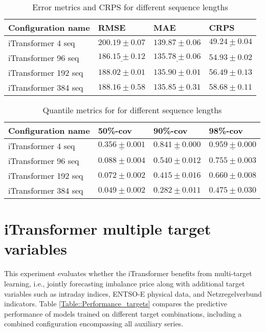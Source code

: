 \documentclass[class=scrbook, crop=false]{standalone}
\begin{document}
 \begin{table}[]
\centering
\begin{tabular}{l|l|l|l}
 Configuration name &  RMSE 		& MAE 			& CRPS \\\hline
iTransformer 4 seq    &$ 200.19 \pm 0.07	$&$ 139.87	\pm 0.06	$&$ \underline{49.24 \pm 0.04	}$ \\
 iTransformer 96 seq &$  \underline{186.15 \pm  0.12} $&$ \underline{135.78 \pm 0.06} $ &$  54.93\pm 0.02$\\
 iTransformer 192 seq &$ 188.02 \pm 0.01$ &$ 135.90 \pm 0.01$&$ 56.49 \pm0.13 $ \\
 iTransformer 384 seq &$ 188.16 \pm 0.58 $&$ 135.85 \pm 0.31 $&$ 58.68 \pm 0.11 $ \\
\end{tabular}
\caption{Error metrics and CRPS for different sequence lengths}
\label{Table::Performance_sequence_length}

\end{table}
\begin{table}
\centering
\begin{tabular}{l|l|l|l}
 Configuration name 	& 50\%-cov 		& 90\%-cov 		& 98\%-cov \\\hline
iTransformer  4 seq   	&$ \underline{0.356	\pm 0.001}$&$ \underline{0.841	\pm 0.000}	$&$\underline{0.959 \pm 0.000}	$ \\
 iTransformer 96 seq 	&$ 0.088 \pm 0.004$&$ 0.540 \pm 0.012$ 	&$ 0.755 \pm 0.003$ \\
 iTransformer 192 seq 	&$ 0.072 \pm 0.002$&$ 0.415\pm 0.016$ 	&$ 0.660 \pm 0.008$ \\
 iTransformer 384 seq 	&$ 0.049 \pm 0.002 $&$ 0.282 \pm 0.011$	&$ 0.475 \pm 0.030$\\
\end{tabular}
\caption{Quantile metrics for for different sequence lengths}
\label{Table::Performance_sequence_length2}
\end{table}



\section{iTransformer multiple target variables}

This experiment evaluates whether the iTransformer benefits from multi-target learning, i.e., jointly forecasting imbalance price along with additional target variables such as intraday indices, ENTSO-E physical data, and Netzregelverbund indicators. Table \ref{Table::Performance_targets} compares the predictive performance of models trained on different target combinations, including a combined configuration encompassing all auxiliary series.
\end{document}
